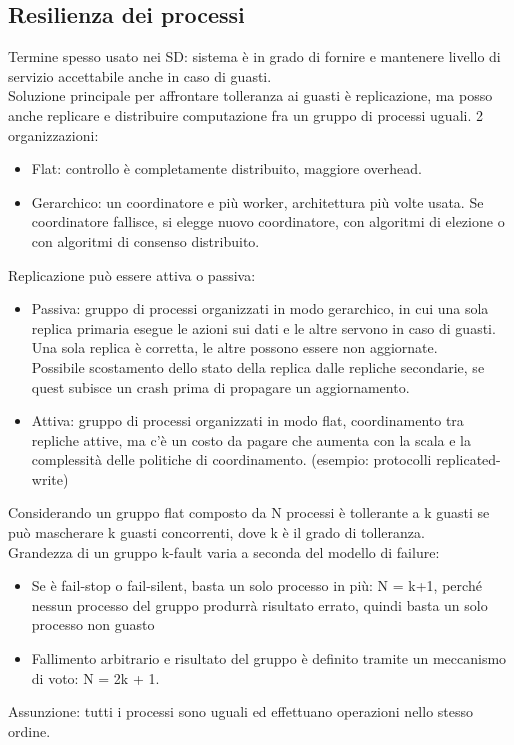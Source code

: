 \documentclass[16px]{article}
\begin{document}
\subsection{Resilienza dei processi}
Termine spesso usato nei SD: sistema è in grado di fornire e mantenere livello di servizio accettabile anche in caso di guasti.\\ Soluzione principale per affrontare tolleranza ai guasti è replicazione, ma posso anche replicare e distribuire computazione fra un gruppo di processi uguali. 2 organizzazioni:
\begin{itemize}
\item Flat: controllo è completamente distribuito, maggiore overhead.
\item Gerarchico: un coordinatore e più worker, architettura più volte usata. Se coordinatore fallisce, si elegge nuovo coordinatore, con algoritmi di elezione o con algoritmi di consenso distribuito.
\end{itemize}
Replicazione può essere attiva o passiva:
\begin{itemize}
\item Passiva: gruppo di processi organizzati in modo gerarchico, in cui una sola replica primaria esegue le azioni sui dati e le altre servono in caso di guasti.\\ Una sola replica è corretta, le altre possono essere non aggiornate.\\ Possibile scostamento dello stato della replica dalle repliche secondarie, se quest subisce un crash prima di propagare un aggiornamento.
\item Attiva: gruppo di processi organizzati in modo flat, coordinamento tra repliche attive, ma c'è un costo da pagare che aumenta con la scala e la complessità delle politiche di coordinamento. (esempio: protocolli replicated-write)
\end{itemize}
Considerando un gruppo flat composto da N processi è tollerante a k guasti se può mascherare k guasti concorrenti, dove k è il grado di tolleranza.\\ Grandezza di un gruppo k-fault varia a seconda del modello di failure:
\begin{itemize}
\item Se è fail-stop o fail-silent, basta un solo processo in più: N = k+1, perché nessun processo del gruppo produrrà risultato errato, quindi basta un solo processo non guasto
\item Fallimento arbitrario e risultato del gruppo è definito tramite un meccanismo di voto: N = 2k + 1.
\end{itemize}
Assunzione: tutti i processi sono uguali ed effettuano operazioni nello stesso ordine.
\end{document}
